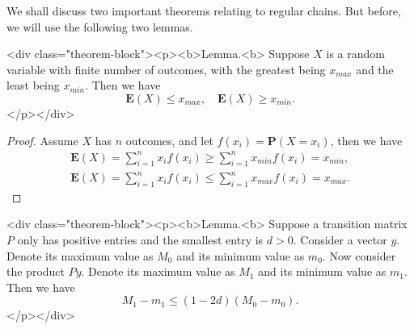 We shall discuss two important theorems relating to regular chains. But before, we will use the following two lemmas.

<div class="theorem-block"><p><b>Lemma.<b> 
\label{lemma:8.1}
Suppose $X$ is a random variable with finite number of outcomes, with the greatest being $x_{max}$ and the least being $x_{min}$. Then we have 
$$\begin{equation}
    \mathbf{E}(X) \leq x_{max}, \quad \mathbf{E}(X) \geq x_{min}.
\end{equation}$$
</p></div>

\begin{proof}
Assume $X$ has $n$ outcomes, and let $f(x_i) = \mathbf{P}(X = x_i)$, then we have
\begin{gather*}
    \mathbf{E}(X) = \sum_{i=1}^n x_i f(x_i) \geq \sum_{i=1}^n x_{min} f(x_i) = x_{min}, \\
    \mathbf{E}(X) = \sum_{i=1}^n x_i f(x_i) \leq \sum_{i=1}^n x_{max} f(x_i) = x_{max}.
\end{gather*}
\end{proof}

<div class="theorem-block"><p><b>Lemma.<b> 
\label{lemma:8.2}
Suppose a transition matrix $P$ only has positive entries and the smallest entry is $d>0$. Consider a vector $y$. Denote its maximum value as $M_0$ and its minimum value as $m_0$. Now consider the product $Py$. Denote its maximum value as $M_1$ and its minimum value as $m_1$. Then we have
$$\begin{equation}
    M_1 - m_1 \leq (1-2d) (M_0 - m_0).
\end{equation}$$
</p></div>

